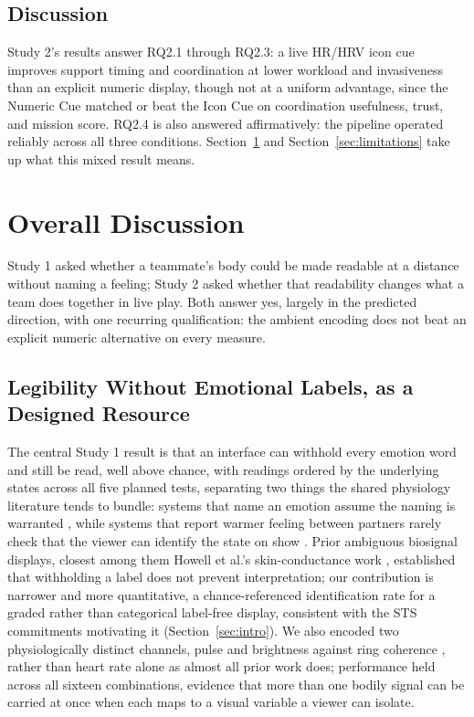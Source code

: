 \documentclass[manuscript,review,anonymous]{acmart}
\begin{document}
\subsection{Discussion}
Study 2's results answer RQ2.1 through RQ2.3: a live HR/HRV icon cue improves support timing and coordination at lower workload and invasiveness than an explicit numeric display, though not at a uniform advantage, since the Numeric Cue matched or beat the Icon Cue on coordination usefulness, trust, and mission score. RQ2.4 is also answered affirmatively: the pipeline operated reliably across all three conditions. Section~\ref{sec:discussion} and Section~\ref{sec:limitations} take up what this mixed result means.

\FloatBarrier

\section{Overall Discussion}
\label{sec:discussion}

Study 1 asked whether a teammate's body could be made readable at a distance without naming a feeling; Study 2 asked whether that readability changes what a team does together in live play. Both answer yes, largely in the predicted direction, with one recurring qualification: the ambient encoding does not beat an explicit numeric alternative on every measure.

\subsection{Legibility Without Emotional Labels, as a Designed Resource}
The central Study 1 result is that an interface can withhold every emotion word and still be read, well above chance, with readings ordered by the underlying states across all five planned tests, separating two things the shared physiology literature tends to bundle: systems that name an emotion assume the naming is warranted \cite{picard_affective_1997, mandryk_fuzzy_2007}, while systems that report warmer feeling between partners rarely check that the viewer can identify the state on show \cite{slovak_understanding_2012, hirsch_my_2023, hassan_augmenting_2024}. Prior ambiguous biosignal displays, closest among them Howell et al.'s skin-conductance work \cite{howell_biosignals_2016}, established that withholding a label does not prevent interpretation; our contribution is narrower and more quantitative, a chance-referenced identification rate for a graded rather than categorical label-free display, consistent with the STS commitments motivating it (Section~\ref{sec:intro}). We also encoded two physiologically distinct channels, pulse and brightness against ring coherence \cite{thayer_model_2000, porges_polyvagal_2007}, rather than heart rate alone as almost all prior work does; performance held across all sixteen combinations, evidence that more than one bodily signal can be carried at once when each maps to a visual variable a viewer can isolate.
\end{document}
